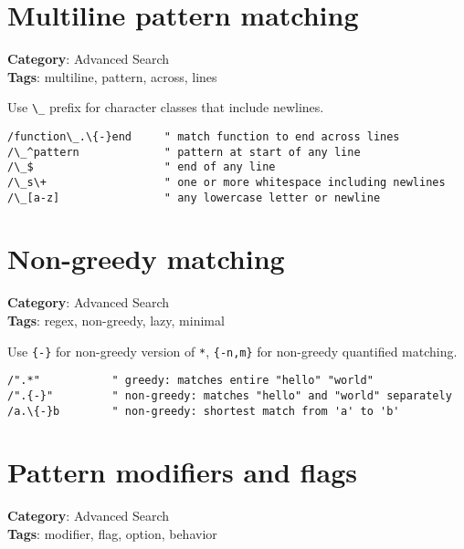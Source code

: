 \section{Multiline pattern matching}

\textbf{Category}: Advanced Search\\ \textbf{Tags}: multiline, pattern, across, lines
\vspace{0.5cm}

Use {\footnotesize \Verb§\_§} prefix for character classes that include newlines.

\begin{Exa*}{}
\begin{Verbatim}[fontsize=\footnotesize, breaklines, breakanywhere]
/function\_.\{-}end     " match function to end across lines
/\_^pattern             " pattern at start of any line
/\_$                    " end of any line
/\_s\+                  " one or more whitespace including newlines
/\_[a-z]                " any lowercase letter or newline
\end{Verbatim}
\end{Exa*}

\section{Non-greedy matching}

\textbf{Category}: Advanced Search\\ \textbf{Tags}: regex, non-greedy, lazy, minimal
\vspace{0.5cm}

Use {\footnotesize \Verb§{-}§} for non-greedy version of {\footnotesize \Verb§*§}, {\footnotesize \Verb§{-n,m}§} for non-greedy quantified matching.

\begin{Exa*}{}
\begin{Verbatim}[fontsize=\footnotesize, breaklines, breakanywhere]
/".*"           " greedy: matches entire "hello" "world"
/".{-}"         " non-greedy: matches "hello" and "world" separately
/a.\{-}b        " non-greedy: shortest match from 'a' to 'b'
\end{Verbatim}
\end{Exa*}

\section{Pattern modifiers and flags}

\textbf{Category}: Advanced Search\\ \textbf{Tags}: modifier, flag, option, behavior
\vspace{0.5cm}

